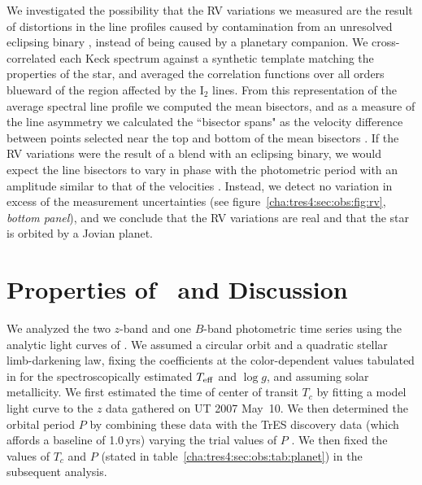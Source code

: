 We investigated the possibility that the RV variations we measured are the 
result of distortions in the line profiles caused by contamination from an 
unresolved eclipsing binary \citep{Santos_Mayor_Naef:aa:2002a, Torres_Konacki_Sasselov:apj:2005a}, instead of being caused by a planetary companion. We cross-correlated 
each Keck spectrum against a synthetic template matching the properties of the 
star, and averaged the correlation functions over all orders blueward of the 
region affected by the I$_2$ lines. From this representation of the average 
spectral line profile we computed the mean bisectors, and as a measure of the
line asymmetry we calculated the ``bisector spans" as the velocity difference 
between points selected near the top and bottom of the mean bisectors 
\citep{Torres_Konacki_Sasselov:apj:2005a}. If the RV variations were the result of a blend with an eclipsing 
binary, we would expect the line bisectors to vary in phase with the 
photometric period with an amplitude similar to that of the velocities 
\citep{Queloz_Henry_Sivan:aa:2001a, Mandushev_Torres_Latham:apj:2005a}. Instead, we detect no variation in excess of the 
measurement uncertainties (see figure~\ref{cha:tres4:sec:obs:fig:rv}, {\it bottom panel}), and we conclude 
that the RV variations are real and that the star is orbited by a Jovian 
planet.

\section{Properties of \tresFour\ and Discussion}
\label{cha:tres4:sec:dis}


We analyzed the two $z$-band and one $B$-band photometric time series using the 
analytic light curves of \citet{Mandel_Agol:apjl:2002a}. We assumed a circular orbit and a 
quadratic stellar limb-darkening law, fixing the coefficients at the 
color-dependent values tabulated in \citet{Claret:aa:2000a, Claret:aa:2004a} for the 
spectroscopically estimated $T_{\rm eff}$ and $\log g$, and assuming solar 
metallicity. We first estimated the time of center of transit $T_c$ by fitting 
a model light curve to the $z$ data gathered on UT 2007 May~10. We then determined the orbital period $P$ by combining these 
data with the TrES discovery data (which affords a baseline of 1.0\,yrs)
varying the trial values of $P$
. We then fixed the values of $T_c$ and $P$ 
(stated in table~\ref{cha:tres4:sec:obs:tab:planet}) in the subsequent analysis.

